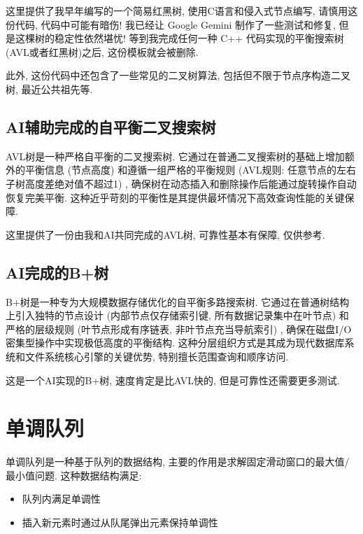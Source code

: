 \documentclass[a4paper]{ctexbook}
\begin{document}
这里提供了我早年编写的一个简易红黑树, 使用C语言和侵入式节点编写, 请慎用这份代码, 代码中可能有暗伤! 我已经让 Google Gemini 制作了一些测试和修复, 但是这棵树的稳定性依然堪忧! 等到我完成任何一种 C++ 代码实现的平衡搜索树(AVL或者红黑树)之后, 这份模板就会被删除.

此外, 这份代码中还包含了一些常见的二叉树算法, 包括但不限于节点序构造二叉树, 最近公共祖先等.



\subsection*{AI辅助完成的自平衡二叉搜索树}

AVL树是一种严格自平衡的二叉搜索树. 它通过在普通二叉搜索树的基础上增加额外的平衡信息 (节点高度) 和遵循一组严格的平衡规则 (AVL规则: 任意节点的左右子树高度差绝对值不超过1) , 确保树在动态插入和删除操作后能通过旋转操作自动恢复完美平衡. 这种近乎苛刻的平衡性是其提供最坏情况下高效查询性能的关键保障.

这里提供了一份由我和AI共同完成的AVL树, 可靠性基本有保障, 仅供参考.



\subsection*{AI完成的B+树}

B+树是一种专为大规模数据存储优化的自平衡多路搜索树. 它通过在普通树结构上引入独特的节点设计 (内部节点仅存储索引键, 所有数据记录集中在叶节点) 和严格的层级规则 (叶节点形成有序链表, 非叶节点充当导航索引) , 确保在磁盘I/O密集型操作中实现极低高度的平衡结构. 这种分层组织方式是其成为现代数据库系统和文件系统核心引擎的关键优势, 特别擅长范围查询和顺序访问.

这是一个AI实现的B+树, 速度肯定是比AVL快的, 但是可靠性还需要更多测试.



\section{单调队列}
单调队列是一种基于队列的数据结构, 主要的作用是求解固定滑动窗口的最大值/最小值问题. 这种数据结构满足:
\begin{itemize}
  \item 队列内满足单调性
  \item 插入新元素时通过从队尾弹出元素保持单调性
\end{itemize}
\end{document}
